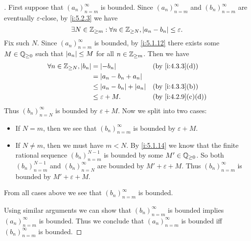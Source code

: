 \begin{proof}[]
  First suppose that \((a_n)_{n = m}^\infty\) is bounded.
  Since \((a_n)_{n = m}^{\infty}\) and \((b_n)_{n = m}^{\infty}\) are eventually \(\varepsilon\)-close, by \cref{i:5.2.3} we have
  \[
    \exists N \in \mathbb{Z}_{\geq m} : \forall n \in \mathbb{Z}_{\geq N}, \left\lvert a_n - b_n\right\rvert \leq \varepsilon.
  \]
  Fix such \(N\).
  Since \((a_n)_{n = m}^\infty\) is bounded, by \cref{i:5.1.12} there exists some \(M \in \mathbb{Q}_{\geq 0}\) such that \(\left\lvert a_n\right\rvert \leq M\) for all \(n \in \mathbb{Z}_{\geq m}\).
  Then we have
  \begin{align*}
    \forall n \in \Z_{\geq N}, \abs{b_n} & = \abs{-b_n}                     &  & \by{i:4.3.3}[d]   \\
                                         & = \abs{a_n - b_n + a_n}                                 \\
                                         & \leq \abs{a_n - b_n} + \abs{a_n} &  & \by{i:4.3.3}[b]   \\
                                         & \leq \varepsilon + M.            &  & \by{i:4.2.9}[c,d]
  \end{align*}
  Thus \((b_n)_{n = N}^\infty\) is bounded by \(\varepsilon + M\).
  Now we split into two cases:
  \begin{itemize}
    \item If \(N = m\), then we see that \((b_n)_{n = m}^\infty\) is bounded by \(\varepsilon + M\).
    \item If \(N \neq m\), then we must have \(m < N\).
          By \cref{i:5.1.14} we know that the finite rational sequence \((b_n)_{n = m}^{N - 1}\) is bounded by some \(M' \in \mathbb{Q}_{\geq 0}\).
          So both \((b_n)_{n = m}^{N - 1}\) and \((b_n)_{n = N}^\infty\) are bounded by \(M' + \varepsilon + M\).
          Thus \((b_n)_{n = m}^\infty\) is bounded by \(M' + \varepsilon + M\).
  \end{itemize}
  From all cases above we see that \((b_n)_{n = m}^\infty\) is bounded.

  Using similar arguments we can show that \((b_n)_{n = m}^\infty\) is bounded implies \((a_n)_{n = m}^\infty\) is bounded.
  Thus we conclude that \((a_n)_{n = m}^\infty\) is bounded iff \((b_n)_{n = m}^\infty\) is bounded.
\end{proof}
